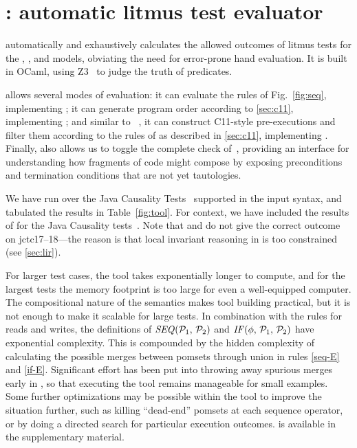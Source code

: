 
\section{\PwTerTITLE: automatic litmus test evaluator}
\label{sec:tool}

\PwTer{} automatically and exhaustively calculates the allowed outcomes of litmus tests for the \PwT, \PwTpo, and \PwTc{} models, obviating the need for error-prone hand evaluation. It is built in OCaml, using Z3~\cite{Z3Solver} to judge the truth of predicates. %

\PwTer{} allows several modes of evaluation: it can evaluate the rules of Fig.~\ref{fig:seq}, implementing \PwT; it can generate program order according to \textsection\ref{sec:c11}, implementing \PwTpo; and similar to \MRD~\cite{DBLP:conf/esop/PaviottiCPWOB20}, it can construct C11-style pre-executions and filter them according to the rules of \rcXI{} as described in \textsection\ref{sec:c11}, implementing \PwTc{}.
Finally, \PwTer{} also allows us to toggle the complete check of~, providing an interface for understanding how fragments of code might compose by exposing preconditions and termination conditions that are not yet tautologies.

We have run \PwTer{} over the Java Causality Tests~\cite{PughWebsite} supported in the input syntax, and tabulated the results in Table~\ref{fig:tool}.
For context, we have included the results of \MRD{} for the Java Causality tests~\cite{DBLP:conf/esop/PaviottiCPWOB20}.
Note that \MRD{} and \MRDRC{} do not give the correct outcome on jctc17--18---the reason is that local invariant reasoning in \MRD{} is too constrained (see \textsection\ref{sec:lir}).

For larger test cases, the tool takes exponentially longer to compute, and for the largest tests the memory footprint is too large for even a well-equipped computer.
The compositional nature of the semantics makes tool building practical, but it is not enough to make it scalable for large tests.
In combination with the rules for reads and writes, the definitions of $\sSEMI{\aPSS_1}{\aPSS_2}$ and $\sIF{\aForm}\sTHEN\aPSS_1\sELSE\aPSS_2\sFI$ have exponential complexity.
This is compounded by the hidden complexity of calculating the possible merges between pomsets through union in rules \ref{seq-E} and \ref{if-E}.
Significant effort has been put into throwing away spurious merges early in \PwTer, so that executing the tool remains manageable for small examples.
Some further optimizations may be possible within the tool to improve the situation further, such as killing ``dead-end'' pomsets at each sequence operator, or by doing a directed search for particular execution outcomes.
\PwTer{} is available in the supplementary material.



